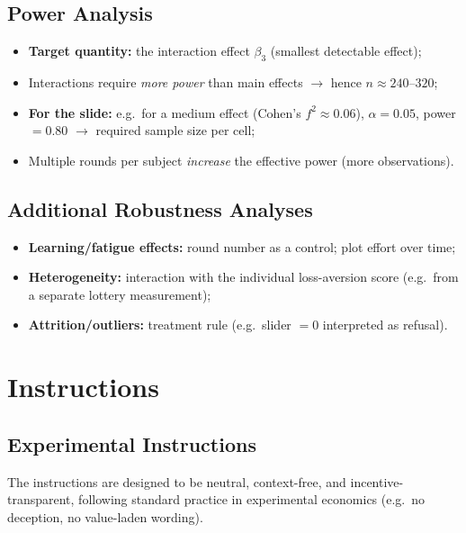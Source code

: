 \documentclass[
    11pt,
    a4paper,
    parskip=half,
    headings=normal
]{scrartcl}
\numberwithin{equation}{section}
\theoremstyle{definition}
\theoremstyle{remark}
\begin{document}
\subsection{Power Analysis}
\begin{itemize}
    \item \textbf{Target quantity:} the interaction effect $\beta_3$ (smallest detectable effect);
    \item Interactions require \emph{more power} than main effects $\rightarrow$ hence $n \approx 240\text{--}320$;
    \item \textbf{For the slide:} e.g.\ for a medium effect (Cohen's $f^2 \approx 0.06$), $\alpha = 0.05$, power $= 0.80$ $\rightarrow$ required sample size per cell;
    \item Multiple rounds per subject \emph{increase} the effective power (more observations).
\end{itemize}

\subsection{Additional Robustness Analyses}
\begin{itemize}
    \item \textbf{Learning/fatigue effects:} round number as a control; plot effort over time;
    \item \textbf{Heterogeneity:} interaction with the individual loss-aversion score (e.g.\ from a separate lottery measurement);
    \item \textbf{Attrition/outliers:} treatment rule (e.g.\ slider $= 0$ interpreted as refusal).
\end{itemize}

\section{Instructions}

\subsection{Experimental Instructions}
The instructions are designed to be neutral, context-free, and
incentive-transparent, following standard practice in experimental economics
(e.g.\ no deception, no value-laden wording).
\end{document}
